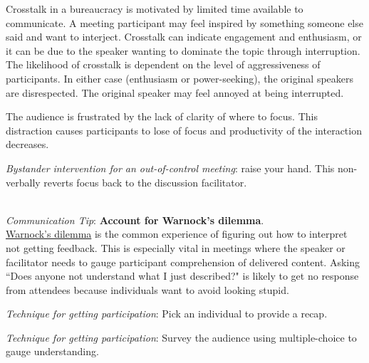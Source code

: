 Crosstalk in a bureaucracy is motivated by
limited time available to communicate. A meeting participant may feel inspired by something someone else said and want to interject. 
Crosstalk can indicate engagement and enthusiasm, or it can be due to the speaker wanting to dominate the topic through interruption. The likelihood of crosstalk is dependent on the level of aggressiveness of participants.
In either case (enthusiasm or power-seeking), the original speakers are disrespected. The original speaker may feel annoyed at being interrupted.



The audience is frustrated by the lack of clarity of where to focus. This distraction causes participants to lose of focus and productivity of the interaction decreases.

\textit{Bystander intervention for an out-of-control meeting}: raise your hand. 
This non-verbally reverts focus back to the discussion facilitator. 

\ \\
\textit{Communication Tip}: \textbf{Account for Warnock's dilemma}.\\
\href{https://en.wikipedia.org/wiki/Warnock\%27s_dilemma}{Warnock's dilemma}
is the common experience of figuring out how to interpret not getting feedback. This is especially vital in meetings where the speaker or facilitator needs to gauge participant comprehension of delivered content. Asking ``Does anyone not understand what I just described?" is likely to get no response from attendees because individuals want to avoid looking stupid.

\textit{Technique for getting participation}: Pick an individual to provide a recap.

\textit{Technique for getting participation}: Survey the audience using multiple-choice to gauge understanding.

